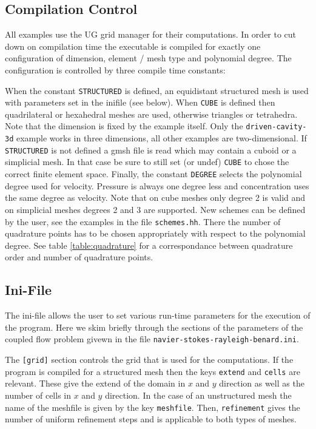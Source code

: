 \documentclass[a4paper,12pt]{article}
\theoremstyle{definition}
\begin{document}
\subsection{Compilation Control}

All examples use the UG grid manager for their computations.
In order to cut down on compilation time the executable is compiled for exactly one configuration
of dimension, element / mesh type and polynomial degree. The configuration is controlled by three compile time constants:

When the constant \lstinline{STRUCTURED} is defined, an equidistant structured mesh is used with
parameters set in the inifile (see below). When \lstinline{CUBE} is defined then quadrilateral or
hexahedral meshes are used, otherwise triangles or tetrahedra.
Note that the dimension is fixed by the example itself. Only the \lstinline{driven-cavity-3d}
example works in three dimensions, all other examples are two-dimensional. 
If \lstinline{STRUCTURED} is not defined a gmsh file is read which may contain a cuboid or
a simplicial mesh. In that case be sure to still set (or undef) \lstinline{CUBE} to chose the correct finite element space.
Finally, the constant \lstinline{DEGREE}
selects the polynomial degree used for velocity. Pressure is always one degree less and concentration uses
the same degree as velocity. Note that on cube meshes only degree 2 is valid and on simplicial meshes degrees 2 and 3
are supported. New schemes can be defined by the user, see the examples
in the file \lstinline{schemes.hh}. There the number of quadrature
points has to be chosen appropriately with respect to the polynomial
degree. See table \ref{table:quadrature} for a correspondance between
quadrature order and number of quadrature points.

\subsection{Ini-File}

The ini-file allows the user to set various run-time parameters for the
execution of the program. Here we skim briefly through the sections of the
parameters of the coupled flow problem givewn in the file \lstinline{navier-stokes-rayleigh-benard.ini}.

The  \lstinline{[grid]} section controls the grid that is used for the computations.
If the program is compiled for a structured mesh then the keys \lstinline{extend}
and \lstinline{cells} are relevant. These give the extend of the domain in $x$ and $y$ direction
as well as the number of cells in $x$ and $y$ direction. In the case of an unstructured mesh the
name of the meshfile is given by the key \lstinline{meshfile}. Then, \lstinline{refinement} gives
the number of uniform refinement steps and is applicable to both types of meshes.
\end{document}
